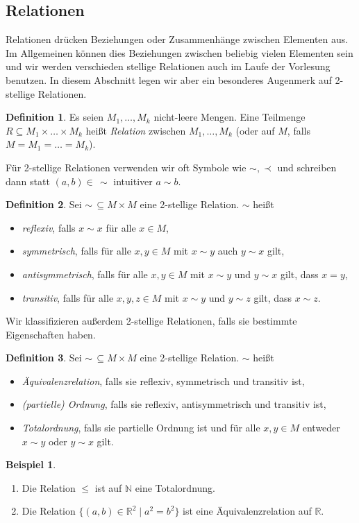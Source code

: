 \documentclass[11pt, a4paper]{article}
\theoremstyle{definition}
\newtheorem{definition}{Definition}[section]
\newtheorem*{example*}{Beispiel}
\theoremstyle{plain}
\numberwithin{equation}{section}
\begin{document}
\subsection{Relationen}\label{sec:pre_relations}
Relationen drücken Beziehungen oder Zusammenhänge zwischen Elementen aus. Im Allgemeinen können dies Beziehungen zwischen beliebig vielen Elementen sein und wir werden verschieden stellige Relationen auch im Laufe der Vorlesung benutzen. In diesem Abschnitt legen wir aber ein besonderes Augenmerk auf 2-stellige Relationen.
\begin{definition}
	Es seien $M_1, \ldots, M_k$ nicht-leere Mengen. Eine Teilmenge $R \subseteq M_1 \times \ldots \times M_k$ heißt \textit{Relation} zwischen $M_1, \ldots, M_k$ (oder auf $M$, falls $M = M_1 = \ldots = M_k$).
\end{definition}
Für 2-stellige Relationen verwenden wir oft Symbole wie $\sim, \prec$ und schreiben dann statt $(a, b) \in\, \sim$ intuitiver $a \sim b$.
\begin{definition}
	Sei $\sim \,\subseteq M \times M$ eine 2-stellige Relation. $\sim$ heißt
	\begin{itemize}
		\item \textit{reflexiv}, falls $x \sim x$ für alle $x \in M$,
		\item \textit{symmetrisch}, falls für alle $x, y \in M$ mit $x \sim y$ auch $y \sim x$ gilt,
		\item \textit{antisymmetrisch}, falls für alle $x, y \in M$ mit $x \sim y$ und $y \sim x$ gilt, dass $x = y$,
		\item \textit{transitiv}, falls für alle $x, y, z \in M$ mit $x \sim y$ und $y \sim z$ gilt, dass $x \sim z$.
	\end{itemize}
\end{definition}
Wir klassifizieren außerdem 2-stellige Relationen, falls sie bestimmte Eigenschaften haben.
\begin{definition}\label{def:relations}
	Sei $\sim \,\subseteq M \times M$ eine 2-stellige Relation. $\sim$ heißt
	\begin{itemize}
		\item \textit{Äquivalenzrelation}, falls sie reflexiv, symmetrisch und transitiv ist,
		\item \textit{(partielle) Ordnung}, falls sie reflexiv, antisymmetrisch und transitiv ist,
		\item \textit{Totalordnung}, falls sie partielle Ordnung ist und für alle $x, y \in M$ entweder $x \sim y$ oder $y \sim x$ gilt. 
	\end{itemize}	 
\end{definition}
\begin{example*}
	\
	\begin{enumerate}
		\item Die Relation $\leq$ ist auf $\mathbb{N}$ eine Totalordnung.
		\item Die Relation $\{(a, b) \in \mathbb{R}^2 \mid a^2 = b^2 \}$ ist eine Äquivalenzrelation auf $\mathbb{R}$.
	\end{enumerate}
\end{example*}
\end{document}
